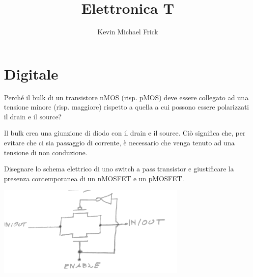 \documentclass[answers,a4paper,12pt]{exam}
\title{Elettronica T}
\author{Kevin Michael Frick}
\date{}
\begin{document}
\maketitle
\section*{Digitale}
\begin{questions}

\question Perché il bulk di un transistore nMOS (risp. pMOS) deve essere collegato ad una tensione minore (risp. maggiore) rispetto a quella a cui possono essere polarizzati il drain e il source?
\begin{solutionorbox}[5cm]
    Il bulk crea una giunzione di diodo con il drain e il source. 
    Ciò significa che, per evitare che ci sia passaggio di corrente, è necessario che venga tenuto ad una tensione di non conduzione.
\end{solutionorbox}

\question Disegnare lo schema elettrico di uno switch a pass transistor e giustificare la presenza contemporanea di un nMOSFET e un pMOSFET.
\begin{solutionorbox}[5cm]
\includegraphics[width=0.7\textwidth]{SwitchPassTransistor}


\end{solutionorbox}
\end{questions}
\end{document}
